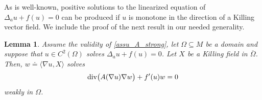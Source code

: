 \documentclass[10 pt,a4paper]{article}
\newtheorem{lemma}[definition]{Lemma}
\theoremstyle{definition}
\begin{document}
As is well-known, positive solutions to the linearized equation of $\Delta_a u + f(u) = 0$ can be produced if $u$ is monotone in the direction of a Killing vector field. We include the proof of the next result in our needed generality.

\begin{lemma}\label{lem_linearKilling}
	Assume the validity of \eqref{assu_A_strong}, 
 	let $\Omega \subseteq M$ be a domain and suppose that $u \in C^2(\Omega)$ solves $\Delta_a u + f(u)=0$. Let $X$ be a Killing field in $\overline\Omega$. Then, $w \doteq \langle \nabla u, X\rangle$ solves
	\begin{equation}\label{linearized_w} 
		\mathrm{div}\big( A(\nabla u) \nabla w\big) + f'(u) w = 0 
	\end{equation}
	weakly in $\Omega$.
\end{lemma}
\end{document}
